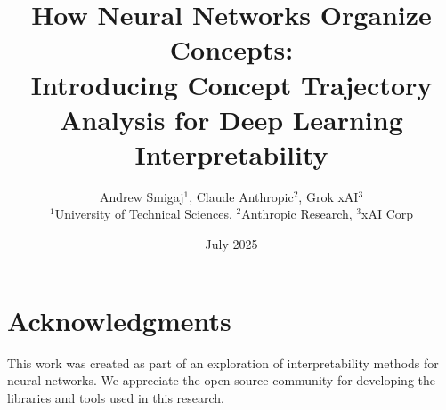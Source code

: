 \documentclass[11pt,a4paper]{article}
\title{How Neural Networks Organize Concepts:\\
Introducing Concept Trajectory Analysis for Deep Learning Interpretability}
\author{Andrew Smigaj$^1$, Claude Anthropic$^2$, Grok xAI$^3$ \\
$^1$University of Technical Sciences, $^2$Anthropic Research, $^3$xAI Corp}
\date{July 2025}
\begin{document}
\maketitle
























\section*{Acknowledgments}
This work was created as part of an exploration of interpretability methods for neural networks. We appreciate the open-source community for developing the libraries and tools used in this research.



\end{document}
